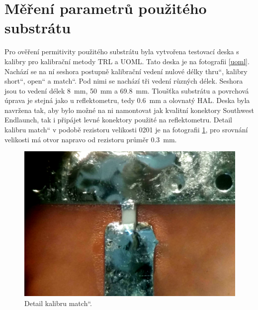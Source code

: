 \section{Měření parametrů použitého substrátu}
Pro ověření permitivity použitého substrátu byla vytvořena testovací deska s kalibry pro kalibrační metody \acrshort{TRL} a \acrshort{UOML}. Tato deska je na fotografii \ref{uoml}. Nachází se na ní seshora postupně kalibrační vedení nulové délky \quotedblbase thru\textquotedblleft , kalibry \quotedblbase short\textquotedblleft , \quotedblbase open\textquotedblleft{} a \quotedblbase match\textquotedblleft{}. Pod nimi se nachází tři vedení různých délek. Seshora jsou to vedení délek \SI{8}{\milli\meter}, \SI{50}{\milli\meter} a \SI{69.8}{\milli\meter}. Tloušťka substrátu a povrchová úprava je stejná jako u reflektometru, tedy \SI{0.6}{\milli\meter} a olovnatý HAL. Deska byla navržena tak, aby bylo možné na ni namontovat jak kvalitní konektory Southwest Endlaunch, tak i připájet levné konektory použité na reflektometru. Detail kalibru \quotedblbase match\textquotedblleft{} v podobě rezistoru velikosti 0201 je na fotografii \ref{match_detail}, pro srovnání velikosti má otvor napravo od rezistoru průměr \SI{0.3}{\milli\meter}.
\begin{figure}[htbp]
\includegraphics[width=\textwidth,keepaspectratio]{images/measurements/match.jpg}\caption{Detail kalibru \quotedblbase match\textquotedblleft .}\label{match_detail}
\end{figure}

